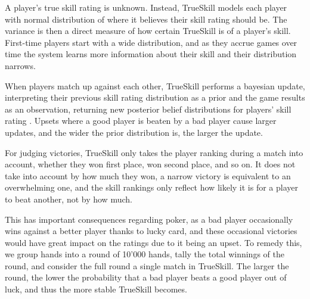 A player's true skill rating is unknown. Instead, TrueSkill models each player with normal distribution of where it believes their skill rating should be. The variance is then a direct measure of how certain TrueSkill is of a player's skill. First-time players start with a wide distribution, and as they accrue games over time the system learns more information about their skill and their distribution narrows.

When players match up against each other, TrueSkill performs a bayesian update, interpreting their previous skill rating distribution as a prior and the game results as an observation, returning new posterior belief distributions for players' skill rating \cite{TrueSkill_original} \cite{TrueSkill_blog}. Upsets where a good player is beaten by a bad player cause larger updates, and the wider the prior distribution is, the larger the update.

For judging victories, TrueSkill only takes the player ranking during a match into account, whether they won first place, won second place, and so on. It does not take into account by how much they won, a narrow victory is equivalent to an overwhelming one, and the skill rankings only reflect how likely it is for a player to beat another, not by how much.

This has important consequences regarding poker, as a bad player occasionally wins against a better player  thanks to lucky card, and these occasional victories would have great impact on the ratings due to it being an upset. To remedy this, we group hands into a round of 10'000 hands, tally the total winnings of the round, and consider the full round a single match in TrueSkill. The larger the round, the lower the probability that a bad player beats a good player out of luck, and thus the more stable TrueSkill becomes.